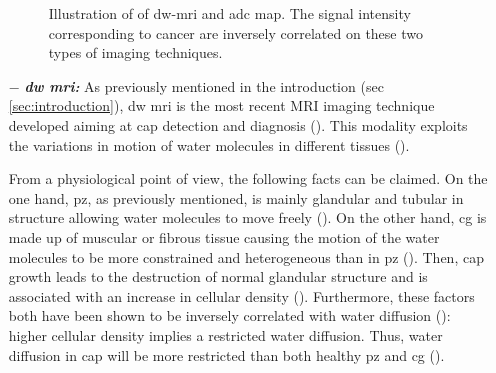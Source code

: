 \begin{enumerate}[leftmargin=*]
\begin{figure}
\centering
	\hspace*{\fill}
	 \hfill
	\hspace*{\fill}
	\caption{Illustration of of \ac{dw}-\ac{mri} and \ac{adc} map. The signal intensity corresponding to cancer are inversely correlated on these two types of imaging techniques.}
	\label{fig:dwi}
\end{figure}

\item[$-$] \textbf{\textit{\ac{dw} \ac{mri}:}} As previously mentioned in the introduction (\acs{sec} \ref{sec:introduction}), \ac{dw} \ac{mri} is the most recent MRI imaging technique developed aiming at \ac{cap} detection and diagnosis (\cite{Scheidler1999}). This modality exploits the variations in motion of water molecules in different tissues (\cite{LeBihan1988,Koh2007}).

From a physiological point of view, the following facts can be claimed. On the one hand, \ac{pz}, as previously mentioned, is mainly glandular and tubular in structure allowing water molecules to move freely (\cite{Choi2007,Hoeks2011}). On the other hand, \ac{cg} is made up of muscular or fibrous tissue causing the motion of the water molecules to be more constrained and heterogeneous than in \ac{pz} (\cite{Hoeks2011}). Then, \ac{cap} growth leads to the destruction of normal glandular structure and is associated with an increase in cellular density (\cite{Hoeks2011,Koh2007,Somford2008}). Furthermore, these factors both have been shown to be inversely correlated with water diffusion (\cite{Koh2007,Somford2008}): higher cellular density implies a restricted water diffusion. Thus, water diffusion in \ac{cap} will be more restricted than both healthy \ac{pz} and \ac{cg} (\cite{Koh2007,Hoeks2011}).


\end{enumerate}
